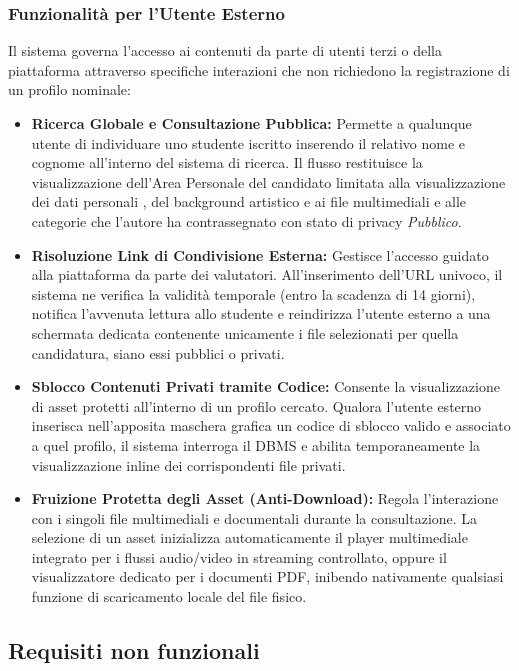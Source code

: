 \documentclass[12pt,a4paper]{article}
\newcommand{\spaziocontenuto}{\mbox{}\par\vspace{1.2cm}}
\begin{document}
\subsubsection{Funzionalità per l'Utente Esterno}
Il sistema governa l'accesso ai contenuti da parte di utenti terzi o della piattaforma attraverso specifiche interazioni che non richiedono la registrazione di un profilo nominale:
\begin{itemize}
    \item \textbf{Ricerca Globale e Consultazione Pubblica:} Permette a qualunque utente di individuare uno studente iscritto inserendo il relativo nome e cognome all'interno del sistema di ricerca. Il flusso restituisce la visualizzazione dell'Area Personale del candidato limitata alla visualizzazione dei dati personali , del background artistico e ai file multimediali e alle categorie che l'autore ha contrassegnato con stato di privacy \textit{Pubblico}.
    \item \textbf{Risoluzione Link di Condivisione Esterna:} Gestisce l'accesso guidato alla piattaforma da parte dei valutatori. All'inserimento dell'URL univoco, il sistema ne verifica la validità temporale (entro la scadenza di 14 giorni), notifica l'avvenuta lettura allo studente e reindirizza l'utente esterno a una schermata dedicata contenente unicamente i file selezionati per quella candidatura, siano essi pubblici o privati.
    \item \textbf{Sblocco Contenuti Privati tramite Codice:} Consente la visualizzazione di asset protetti all'interno di un profilo cercato. Qualora l'utente esterno inserisca nell'apposita maschera grafica un codice di sblocco valido e associato a quel profilo, il sistema interroga il DBMS e abilita temporaneamente la visualizzazione inline dei corrispondenti file privati.
    \item \textbf{Fruizione Protetta degli Asset (Anti-Download):} Regola l'interazione con i singoli file multimediali e documentali durante la consultazione. La selezione di un asset inizializza automaticamente il player multimediale integrato per i flussi audio/video in streaming controllato, oppure il visualizzatore dedicato per i documenti PDF, inibendo nativamente qualsiasi funzione di scaricamento locale del file fisico.
\end{itemize}

\spaziocontenuto

\subsection{Requisiti non funzionali}
\end{document}

